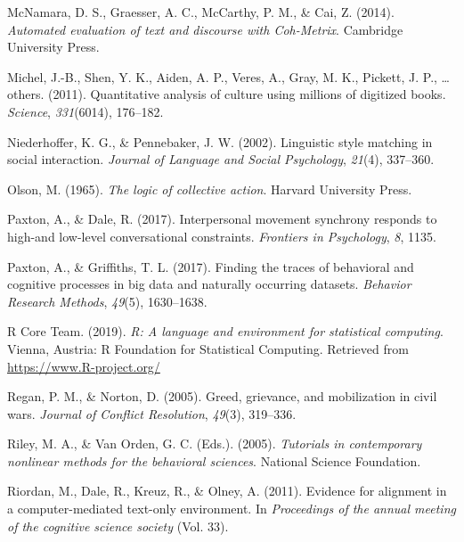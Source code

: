 \documentclass[english,man]{apa6}
\begin{document}
\leavevmode\hypertarget{ref-mcnamara2014automated}{}%
McNamara, D. S., Graesser, A. C., McCarthy, P. M., \& Cai, Z. (2014). \emph{Automated evaluation of text and discourse with Coh-Metrix}. Cambridge University Press.

\leavevmode\hypertarget{ref-michel2011quantitative}{}%
Michel, J.-B., Shen, Y. K., Aiden, A. P., Veres, A., Gray, M. K., Pickett, J. P., \ldots{} others. (2011). Quantitative analysis of culture using millions of digitized books. \emph{Science}, \emph{331}(6014), 176--182.

\leavevmode\hypertarget{ref-niederhoffer2002linguistic}{}%
Niederhoffer, K. G., \& Pennebaker, J. W. (2002). Linguistic style matching in social interaction. \emph{Journal of Language and Social Psychology}, \emph{21}(4), 337--360.

\leavevmode\hypertarget{ref-olson1965logic}{}%
Olson, M. (1965). \emph{The logic of collective action}. Harvard University Press.

\leavevmode\hypertarget{ref-paxton2017interpersonal}{}%
Paxton, A., \& Dale, R. (2017). Interpersonal movement synchrony responds to high-and low-level conversational constraints. \emph{Frontiers in Psychology}, \emph{8}, 1135.

\leavevmode\hypertarget{ref-paxton2017finding}{}%
Paxton, A., \& Griffiths, T. L. (2017). Finding the traces of behavioral and cognitive processes in big data and naturally occurring datasets. \emph{Behavior Research Methods}, \emph{49}(5), 1630--1638.

\leavevmode\hypertarget{ref-R-base}{}%
R Core Team. (2019). \emph{R: A language and environment for statistical computing}. Vienna, Austria: R Foundation for Statistical Computing. Retrieved from \url{https://www.R-project.org/}

\leavevmode\hypertarget{ref-regan2005greed}{}%
Regan, P. M., \& Norton, D. (2005). Greed, grievance, and mobilization in civil wars. \emph{Journal of Conflict Resolution}, \emph{49}(3), 319--336.

\leavevmode\hypertarget{ref-riley2005tutorials}{}%
Riley, M. A., \& Van Orden, G. C. (Eds.). (2005). \emph{Tutorials in contemporary nonlinear methods for the behavioral sciences}. National Science Foundation.

\leavevmode\hypertarget{ref-riordan2011evidence}{}%
Riordan, M., Dale, R., Kreuz, R., \& Olney, A. (2011). Evidence for alignment in a computer-mediated text-only environment. In \emph{Proceedings of the annual meeting of the cognitive science society} (Vol. 33).
\end{document}
